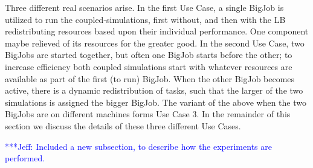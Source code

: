 \documentclass[conference,final]{IEEEtran}
\newcommand{\jhanote}[1]{ {\textcolor{red} { ***Jha: #1 }}}
\newcommand{\skonote}[1]{ {\textcolor{blue} { ***Jeff: #1 }}}
\newcommand{\jhanote}[1]{}
\newcommand{\skonote}[1]{}
\begin{document}
Three different real scenarios arise. In the first Use Case, a single BigJob is utilized to run the coupled-simulations, first without, and then with the LB redistributing resources based upon their individual performance. One component maybe relieved of its resources for the greater good. In the second Use Case, two BigJobs are started together, but often one BigJob starts before the other; to increase efficiency both coupled simulations start with whatever resources are available as part of the first (to run) BigJob. When the other BigJob becomes active, there is a dynamic redistribution of tasks, such that
the larger of the two simulations is assigned the bigger BigJob. The variant of the above when
the two BigJobs are on different machines forms Use Case 3. In the remainder of this section we discuss
the details of these three different Use Cases.



\skonote{Included a new subsection, to describe how the experiments are performed.}
\end{document}
